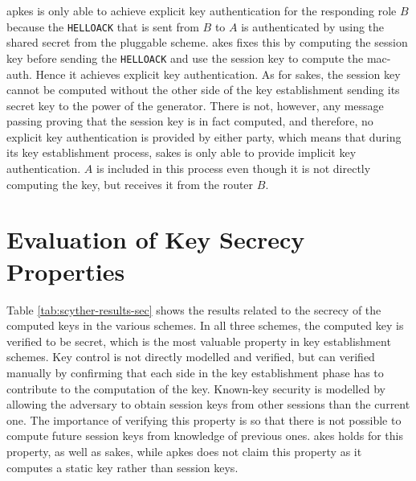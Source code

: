 \gls{apkes} is only able to achieve explicit key authentication for the responding role $B$ because the \texttt{HELLOACK} that is sent from $B$ to $A$ is authenticated by using the shared secret from the pluggable scheme. \gls{akes} fixes this by computing the session key before sending the \texttt{HELLOACK} and use the session key to compute the \gls{mac-auth}. Hence it achieves explicit key authentication. As for \gls{sakes}, the session key cannot be computed without the other side of the key establishment sending its secret key to the power of the generator. There is not, however, any message passing proving that the session key is in fact computed, and therefore, no explicit key authentication is provided by either party, which means that during its key establishment process, \gls{sakes} is only able to provide implicit key authentication. $A$ is included in this process even though it is not directly computing the key, but receives it from the router $B$.

\section{Evaluation of Key Secrecy Properties}

Table \ref{tab:scyther-results-sec} shows the results related to the secrecy of the computed keys in the various schemes. In all three schemes, the computed key is verified to be secret, which is the most valuable property in key establishment schemes. Key control is not directly modelled and verified, but can verified manually by confirming that each side in the key establishment phase has to contribute to the computation of the key. Known-key security is modelled by allowing the adversary to obtain session keys from other sessions than the current one. The importance of verifying this property is so that there is not possible to compute future session keys from knowledge of previous ones. \gls{akes} holds for this property, as well as \gls{sakes}, while \gls{apkes} does not claim this property as it computes a static key rather than session keys.

